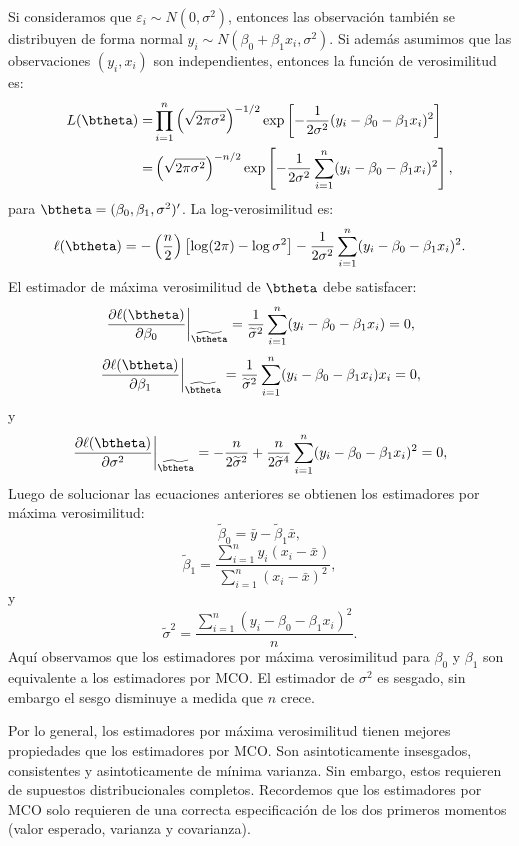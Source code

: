 \documentclass[
]{article}
\begin{document}
Si consideramos que \(\varepsilon_{i}\sim N(0,\sigma^{2})\), entonces las observación también se distribuyen de forma normal \(y_{i}\sim N(\beta_{0}+\beta_{1}x_{i},\sigma^{2})\). Si además asumimos que las observaciones \((y_{i},x_{i})\) son independientes, entonces la función de verosimilitud es:
\begin{equation}
\begin{split}
L(\btheta) =& \prod_{i=1}^{n} \left(\sqrt{2\pi\sigma^{2}} \right)^{-1/2}\exp\left[ - \frac{1}{2\sigma^{2}}(y_{i}-\beta_{0}-\beta_{1}x_{i})^{2} \right] \\
=& \left( \sqrt{2\pi\sigma^{2}} \right)^{-n/2}\exp\left[ - \frac{1}{2\sigma^{2}} \sum_{i=1}^{n}(y_{i}-\beta_{0}-\beta_{1}x_{i})^{2}\right],
\end{split}
\nonumber
\end{equation}
para \(\btheta=(\beta_{0},\beta_{1},\sigma^{2})'\). La log-verosimilitud es:
\[
\ell (\btheta) = - \left(\frac{n}{2}\right)\left[ \log (2 \pi) - \log \sigma^{2}\right] - \frac{1}{2\sigma^{2}}\sum_{i=1}^{n}(y_{i} - \beta_{0}-\beta_{1}x_{i})^{2}. 
\]
El estimador de máxima verosimilitud de \(\btheta\) debe satisfacer:
\[
\left. \frac{\partial \ell(\btheta)}{\partial \beta_{0}} \right|_{\widetilde{\btheta}} = \frac{1}{\widetilde{\sigma}^{2}}\sum_{i=1}^{n}(y_{i} - \beta_{0}-\beta_{1}x_{i}) = 0,
\]
\[
\left. \frac{\partial \ell(\btheta)}{\partial \beta_{1}} \right|_{\widetilde{\btheta}} = \frac{1}{\widetilde{\sigma}^{2}}\sum_{i=1}^{n}(y_{i} - \beta_{0}-\beta_{1}x_{i})x_{i} = 0,
\]
y
\[
\left. \frac{\partial \ell(\btheta)}{\partial \sigma^{2}} \right|_{\widetilde{\btheta}} = -\frac{n}{2\widetilde{\sigma}^{2}} + \frac{n}{2\widetilde{\sigma}^{4}}
\sum_{i=1}^{n}(y_{i} - \beta_{0}-\beta_{1}x_{i})^{2} = 0,
\]
Luego de solucionar las ecuaciones anteriores se obtienen los estimadores por máxima verosimilitud:
\[
\widetilde{\beta}_{0} = \bar{y} - \widetilde{\beta}_{1}\bar{x},
\]
\[
\widetilde{\beta}_{1} = \frac{\sum_{i=1}^{n}y_{i}(x_{i}-\bar{x})}{\sum_{i=1}^{n}(x_{i}-\bar{x})^{2}},
\]
y
\[
\widetilde{\sigma}^{2} = \frac{\sum_{i=1}^{n}(y_{i}-\beta_{0}-\beta_{1}x_{i})^{2}}{n}.
\]
Aquí observamos que los estimadores por máxima verosimilitud para \(\beta_{0}\) y \(\beta_{1}\) son equivalente a los estimadores por MCO. El estimador de \(\sigma^{2}\) es sesgado, sin embargo el sesgo disminuye a medida que \(n\) crece.

Por lo general, los estimadores por máxima verosimilitud tienen mejores propiedades que los estimadores por MCO. Son asintoticamente insesgados, consistentes y asintoticamente de mínima varianza. Sin embargo, estos requieren de supuestos distribucionales completos. Recordemos que los estimadores por MCO solo requieren de una correcta especificación de los dos primeros momentos (valor esperado, varianza y covarianza).
\end{document}

